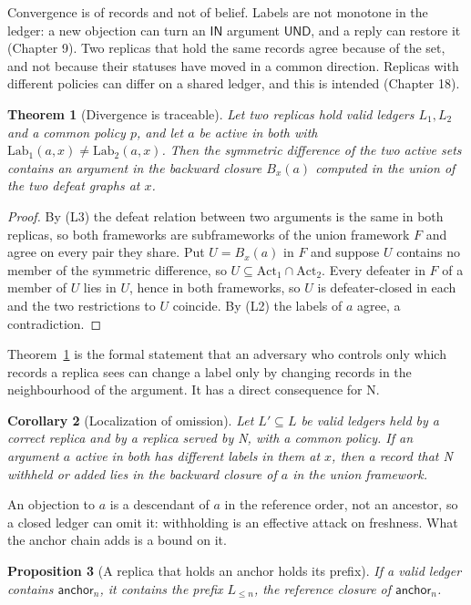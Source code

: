 \documentclass[11pt]{article}
\theoremstyle{plain}
\newtheorem{theorem}{Theorem}
\newtheorem{proposition}[theorem]{Proposition}
\newtheorem{corollary}[theorem]{Corollary}
\theoremstyle{definition}
\theoremstyle{remark}
\newcommand{\IN}{\textsf{IN}}
\newcommand{\UND}{\textsf{UND}}
\newcommand{\Lab}{\mathrm{Lab}}
\newcommand{\Act}{\mathrm{Act}}
\begin{document}
Convergence is of records and not of belief. Labels are not monotone in the ledger: a new objection can turn an $\IN$ argument $\UND$, and a reply can restore it (Chapter 9). Two replicas that hold the same records agree because of the set, and not because their statuses have moved in a common direction. Replicas with different policies can differ on a shared ledger, and this is intended (Chapter 18).

\begin{theorem}[Divergence is traceable]\label{thm:trace}
Let two replicas hold valid ledgers $L_1,L_2$ and a common policy $p$, and let $a$ be active in both with $\Lab_1(a,x)\ne\Lab_2(a,x)$. Then the symmetric difference of the two active sets contains an argument in the backward closure $B_x(a)$ computed in the union of the two defeat graphs at $x$.
\end{theorem}

\begin{proof}
By (L3) the defeat relation between two arguments is the same in both replicas, so both frameworks are subframeworks of the union framework $F$ and agree on every pair they share. Put $U=B_x(a)$ in $F$ and suppose $U$ contains no member of the symmetric difference, so $U\subseteq\Act_1\cap\Act_2$. Every defeater in $F$ of a member of $U$ lies in $U$, hence in both frameworks, so $U$ is defeater-closed in each and the two restrictions to $U$ coincide. By (L2) the labels of $a$ agree, a contradiction.
\end{proof}

Theorem~\ref{thm:trace} is the formal statement that an adversary who controls only which records a replica sees can change a label only by changing records in the neighbourhood of the argument. It has a direct consequence for N.

\begin{corollary}[Localization of omission]\label{cor:omission}
Let $L'\subseteq L$ be valid ledgers held by a correct replica and by a replica served by N, with a common policy. If an argument $a$ active in both has different labels in them at $x$, then a record that N withheld or added lies in the backward closure of $a$ in the union framework.
\end{corollary}

An objection to $a$ is a descendant of $a$ in the reference order, not an ancestor, so a closed ledger can omit it: withholding is an effective attack on freshness. What the anchor chain adds is a bound on it.

\begin{proposition}[A replica that holds an anchor holds its prefix]\label{prop:prefixheld}
If a valid ledger contains $\mathsf{anchor}_n$, it contains the prefix $L_{\le n}$, the reference closure of $\mathsf{anchor}_n$.
\end{proposition}
\end{document}
